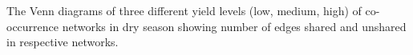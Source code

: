 The Venn diagrams of three different yield levels (low, medium, high) of co-occurrence networks in dry season showing number of edges shared and unshared in respective networks.